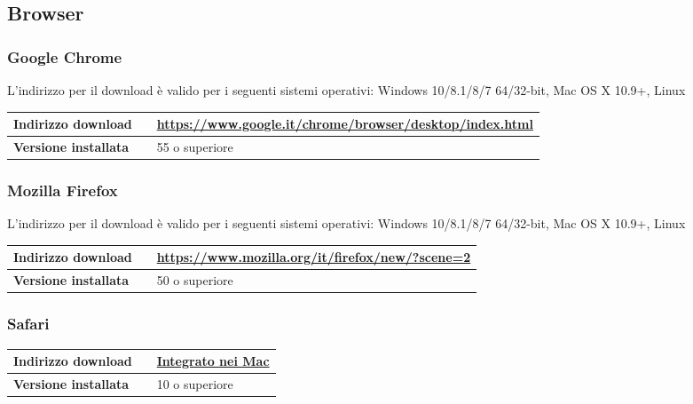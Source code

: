	\subsection{Browser}
		\subsubsection{Google Chrome}
		L'indirizzo per il download è valido per i seguenti sistemi operativi: Windows 10/8.1/8/7 64/32-bit, Mac OS X 10.9+, Linux
		\begin{table}[H]
			\centering
			\begin{tabular}{p{2cm}p{0.5cm}p{11.5cm}}
				\arrayrulecolor{lightgray}
				\toprule
				\textbf{Indirizzo download} & &
				\url{https://www.google.it/chrome/browser/desktop/index.html}
				\\ \midrule
				\textbf{Versione installata} & &
				55 o superiore
				\\ \bottomrule
			\end{tabular}
		\end{table}
		\subsubsection{Mozilla Firefox}
				L'indirizzo per il download è valido per i seguenti sistemi operativi: Windows 10/8.1/8/7 64/32-bit, Mac OS X 10.9+, Linux
		\begin{table}[H]
			\centering
			\begin{tabular}{p{2cm}p{0.5cm}p{11.5cm}}
				\arrayrulecolor{lightgray}
				\toprule
				\textbf{Indirizzo download} & &
				\url{https://www.mozilla.org/it/firefox/new/?scene=2}
				\\ \midrule
				\textbf{Versione installata} & &
				50 o superiore
				\\ \bottomrule
			\end{tabular}
		\end{table}
		\subsubsection{Safari}
		\begin{table}[H]
			\centering
			\begin{tabular}{p{2cm}p{0.5cm}p{11.5cm}}
				\arrayrulecolor{lightgray}
				\toprule
				\textbf{Indirizzo download} & &
				\url{Integrato nei Mac}
				\\ \midrule
				\textbf{Versione installata} & &
				10 o superiore
				\\ \bottomrule
			\end{tabular}
		\end{table}
